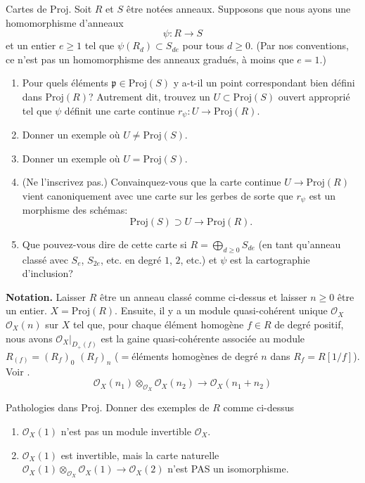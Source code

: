\begin{exercise}
\label{exercise-morphism-proj}
Cartes de $\text{Proj}$. Soit $R$ et $S$ être notées anneaux. Supposons que
nous ayons une homomorphisme d'anneaux
$$
\psi : R \to S
$$
et un entier $e \geq 1$ tel que $\psi(R_d) \subset S_{de}$ pour tous
$d \geq 0$. (Par nos conventions, ce n'est pas un homomorphisme des anneaux
gradués, à moins que $e = 1$.)
\begin{enumerate}
\item Pour quels éléments $\mathfrak p \in \text{Proj}(S)$ y
a-t-il un point correspondant bien défini dans $\text{Proj}(R)$? Autrement dit, trouvez
un $U \subset \text{Proj}(S)$ ouvert approprié tel que $\psi$ définit une
carte continue $r_\psi : U \to \text{Proj}(R)$.
\item Donner un exemple où $U \not = \text{Proj}(S)$.
\item Donner un exemple où $U = \text{Proj}(S)$.
\item (Ne l'inscrivez pas.) Convainquez-vous que la carte continue
$U \to \text{Proj}(R)$ vient canoniquement avec une carte sur les
gerbes de sorte que $r_\psi$ est un morphisme des schémas:
$$
\text{Proj}(S) \supset U \longrightarrow \text{Proj}(R).
$$
\item Que pouvez-vous dire de cette carte
si $R = \bigoplus_{d \geq 0} S_{de}$ (en tant qu'anneau classé
avec $S_e$, $S_{2e}$, etc. en degré $1$, $2$, etc.) et
$\psi$ est la cartographie d'inclusion?
\end{enumerate}
\end{exercise}

\noindent
{\bf Notation.} Laisser $R$ être un anneau classé
comme ci-dessus et laisser $n \geq 0$ être un entier. $X =
\text{Proj}(R)$. Ensuite, il y a un module quasi-cohérent unique ${\mathcal O}_X$ ${\mathcal
O}_X(n)$ sur $X$ tel que, pour chaque élément homogène $f
\in R$ de degré positif, nous avons ${\mathcal O}_X |_{D_{+}(f)}$ est
la gaine quasi-cohérente associée au module $R_{(f)} = (R_f)_0$ $(R_f)_n$ ($ =
$éléments homogènes de degré $n$ dans $R_f = R[1/f]$). Voir
\cite[page 116+]{H}.
$$
{\mathcal O}_X(n_1) \otimes_{{\mathcal O}_X} {\mathcal O}_X(n_2)
\longrightarrow
{\mathcal O}_X(n_1 + n_2)
$$

\begin{exercise}
\label{exercise-pathologies-proj}
Pathologies dans $\text{Proj}$. Donner
des exemples de $R$ comme ci-dessus
\begin{enumerate}
\item ${\mathcal O}_X(1)$ n'est pas un module invertible ${\mathcal O}_X$.
\item ${\mathcal O}_X(1)$ est invertible, mais
la carte naturelle ${\mathcal O}_X(1) \otimes_{{\mathcal O}_X} {\mathcal O}_X(1) \to {\mathcal
O}_X(2)$ n'est PAS un isomorphisme.
\end{enumerate}
\end{exercise}

